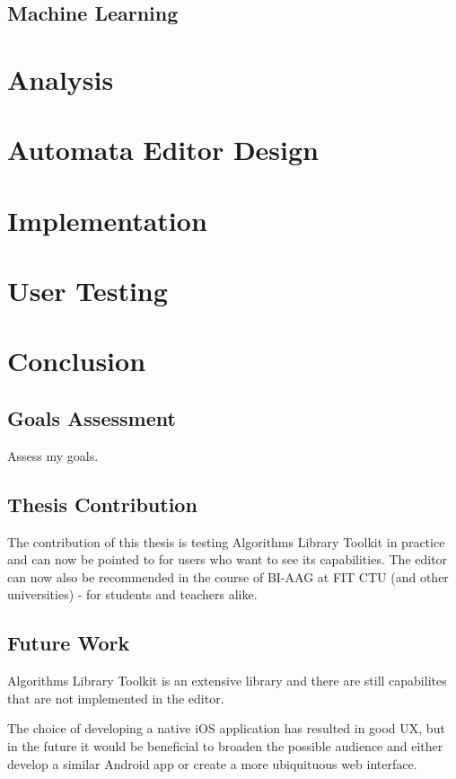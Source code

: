 \section{Machine Learning}

\chapter{Analysis}
\label{chap:analysis}

\chapter{Automata Editor Design}
\label{chap:design}

\chapter{Implementation}
\label{chap:implementation}

\chapter{User Testing}

\chapter{Conclusion}

\section{Goals Assessment}

Assess my goals.

\section{Thesis Contribution}

The contribution of this thesis is testing Algorithms Library Toolkit in practice and can now be pointed to for users who want to see its capabilities. The editor can now also be recommended in the course of BI-AAG at FIT CTU (and other universities) - for students and teachers alike.

\section{Future Work}

Algorithms Library Toolkit is an extensive library and there are still capabilites that are not implemented in the editor.

The choice of developing a native iOS application has resulted in good UX, but in the future it would be beneficial to broaden the possible audience and either develop a similar Android app or create a more ubiquituous web interface.
